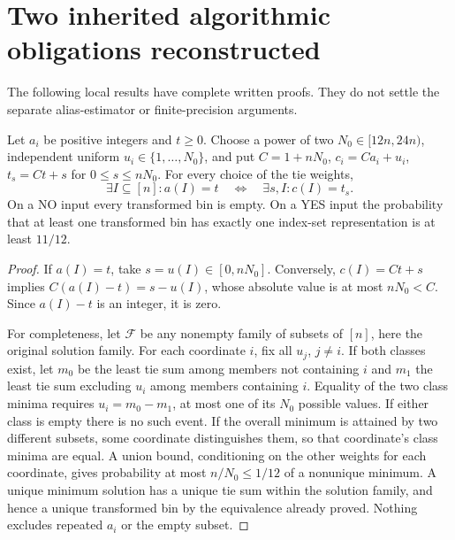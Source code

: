 \section{Two inherited algorithmic obligations reconstructed}\label{sec:algorithmic}
The following local results have complete written proofs. They do not
settle the separate alias-estimator or finite-precision arguments.

\begin{theorem}\label{thm:isolation}
Let $a_i$ be positive integers and $t\ge0$. Choose a power of two
$N_0\in[12n,24n)$, independent uniform $u_i\in\{1,\ldots,N_0\}$,
and put $C=1+nN_0$, $c_i=Ca_i+u_i$, $t_s=Ct+s$ for
$0\le s\le nN_0$. For every choice of the tie weights,
\[
 \exists I\subseteq[n]:a(I)=t
 \quad\Longleftrightarrow\quad
 \exists s,I:c(I)=t_s.
\]
On a NO input every transformed bin is empty. On a YES input the
probability that at least one transformed bin has exactly one index-set
representation is at least $11/12$.
\end{theorem}
\begin{proof}
If $a(I)=t$, take $s=u(I)\in[0,nN_0]$. Conversely,
$c(I)=Ct+s$ implies $C(a(I)-t)=s-u(I)$, whose absolute value is at
most $nN_0<C$. Since $a(I)-t$ is an integer, it is zero.

For completeness, let $\mathcal F$ be any nonempty family of subsets
of $[n]$, here the original solution family. For each coordinate $i$,
fix all $u_j$, $j\ne i$. If both classes exist, let $m_0$ be the
least tie sum among members not containing $i$ and $m_1$ the least
tie sum excluding $u_i$ among members containing $i$. Equality of the
two class minima requires $u_i=m_0-m_1$, at most one of its $N_0$
possible values. If either class is empty there is no such event.
If the overall minimum is attained by two different subsets, some
coordinate distinguishes them, so that coordinate's class minima
are equal. A union bound, conditioning on the other weights for each
coordinate, gives probability at most $n/N_0\le1/12$ of a nonunique
minimum. A unique minimum solution has a unique tie sum within the
solution family, and hence a unique transformed bin by the equivalence
already proved. Nothing excludes repeated $a_i$ or the empty subset.
\end{proof}

